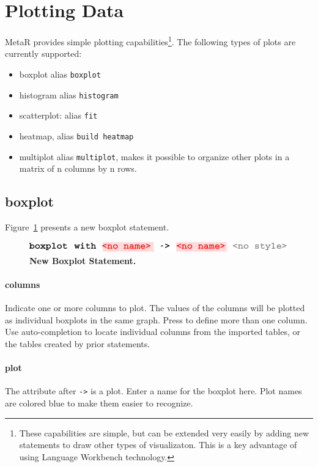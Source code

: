 \section{Plotting Data}
MetaR provides simple plotting capabilities\footnote{These capabilities are simple, but can be extended very easily by adding new statements to draw other types of visualizaton. This is a key advantage of using Language Workbench technology.}. The following types of plots are currently supported: 
\begin{itemize}
  \item boxplot alias \texttt{boxplot}
  \item histogram alias \texttt{histogram}
  \item scatterplot: alias \texttt{fit}
  \item heatmap, alias \texttt{build heatmap}
  \item multiplot alias \texttt{multiplot}, makes it possible to organize other plots in a matrix of n columns by n rows.
\end{itemize}

\subsection{boxplot}
Figure~\ref{fig:NewBoxPlot} presents a new boxplot statement.

\begin{figure}
  \centering
  \includegraphics[width=\figWidthNarrow]{figures/NewBoxplot.pdf}
\caption[New Boxplot Statement.]{\textbf{New Boxplot Statement.}}
\label{fig:NewBoxPlot}
\end{figure}

\paragraph{columns}
Indicate one or more columns to plot. The values of the columns will be plotted as individual boxplots in the same graph. Press \keys{\enter} to define more than one column. Use auto-completion to locate individual columns from the imported tables, or the tables created by prior statements. 

\paragraph{plot}
The attribute after \texttt{->} is a plot. Enter a name for the boxplot here. Plot names are colored blue to make them easier to recognize.


